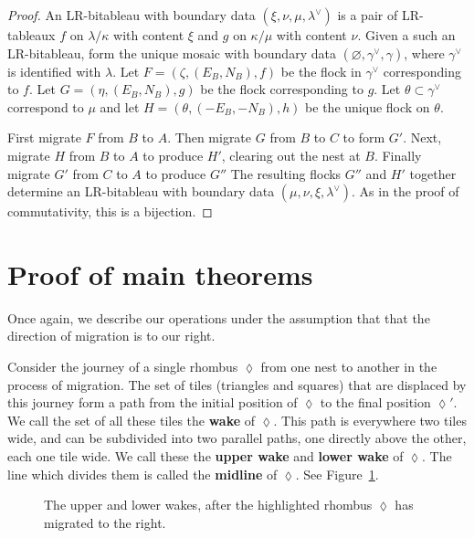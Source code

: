 \begin{proof}
An LR-bitableau with boundary data $(\xi, \nu, \mu, \lambda^\vee)$
is a pair of LR-tableaux $f$ on $\lambda/\kappa$ with content $\xi$
and $g$ on $\kappa/\mu$ with content $\nu$.
Given a such an LR-bitableau, form the unique mosaic with boundary 
data $(\varnothing, \gamma^\vee, \gamma)$, where $\gamma^\vee$ is identified 
with $\lambda$.  
Let
$F = (\zeta, (E_B, N_B), f)$ be the flock in $\gamma^\vee$ corresponding
to $f$. Let  $G = (\eta, (E_B, N_B), g)$ be the flock corresponding
to $g$. Let $\theta \subset \gamma^\vee$ correspond to $\mu$ and let 
$H = (\theta, (-E_B, -N_B), h)$ be the unique flock on $\theta$.

First migrate $F$ from $B$ to $A$. Then migrate $G$ from $B$ 
to $C$ to form $G'$. 
Next, migrate
$H$ from $B$ to $A$ to produce $H'$, clearing out the nest at $B$.
Finally migrate $G'$ from $C$ to $A$ to produce $G''$ 
The resulting flocks $G''$ and $H'$ together determine an
LR-bitableau with boundary data
$(\mu, \nu, \xi, \lambda^\vee)$.  As in the proof of commutativity,
this is a bijection.
\end{proof}

\section{Proof of main theorems}
\label{sec:proofs}

Once again, we describe our operations under the assumption that
that the direction of migration is to our right.

Consider the journey of a single rhombus $\lozenge$ from one nest to 
another in the process of migration.  The set of 
tiles (triangles and squares) that are displaced by this journey
form a path from the initial position of $\lozenge$ to 
the final position $\lozenge'$.  We call the set of all these
tiles the {\bf wake} of
$\lozenge$.  This path is everywhere two tiles wide, and 
can be subdivided into two parallel paths, one directly above the 
other, each one tile wide.  We call these the {\bf upper wake} and
{\bf lower wake} of $\lozenge$.  The line which divides them
is called the {\bf midline} of $\lozenge$.  See Figure~\ref{fig:wake}.

%
\begin{figure}[htbp]
\begin{center}
\caption{The upper and lower wakes, after the highlighted rhombus
$\lozenge$ has migrated to the right.}
\label{fig:wake}
\end{center}
\end{figure}
%

